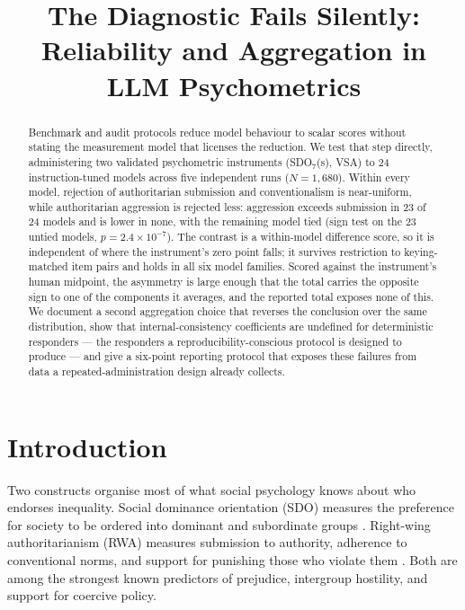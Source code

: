 \documentclass{article}
\title{The Diagnostic Fails Silently: Reliability and Aggregation in LLM
Psychometrics}
\begin{document}
\maketitle


\begin{abstract}
Benchmark and audit protocols reduce model behaviour to scalar scores without stating the measurement model that licenses the reduction. We test that step directly, administering two validated psychometric instruments (SDO$_7$(s), VSA) to 24 instruction-tuned models across five independent runs ($N = 1{,}680$). Within every model, rejection of authoritarian submission and conventionalism is near-uniform, while authoritarian aggression is rejected less: aggression exceeds submission in 23 of 24 models and is lower in none, with the remaining model tied (sign test on the 23 untied models, $p = 2.4 \times 10^{-7}$). The contrast is a within-model difference score, so it is independent of where the instrument's zero point falls; it survives restriction to keying-matched item pairs and holds in all six model families. Scored against the instrument's human midpoint, the asymmetry is large enough that the total carries the opposite sign to one of the components it averages, and the reported total exposes none of this. We document a second aggregation choice that reverses the conclusion over the same distribution, show that internal-consistency coefficients are undefined for deterministic responders --- the responders a reproducibility-conscious protocol is designed to produce --- and give a six-point reporting protocol that exposes these failures from data a repeated-administration design already collects.
\end{abstract}

\section{Introduction}\label{sec-intro}

Two constructs organise most of what social psychology knows about who
endorses inequality. Social dominance orientation (SDO) measures the
preference for society to be ordered into dominant and subordinate
groups \citep{pratto1994, sidanius1999}. Right-wing authoritarianism
(RWA) measures submission to authority, adherence to conventional norms,
and support for punishing those who violate them
\citep{altemeyer1981, altemeyer1996}. Both are among the strongest known
predictors of prejudice, intergroup hostility, and support for coercive
policy.
\end{document}
